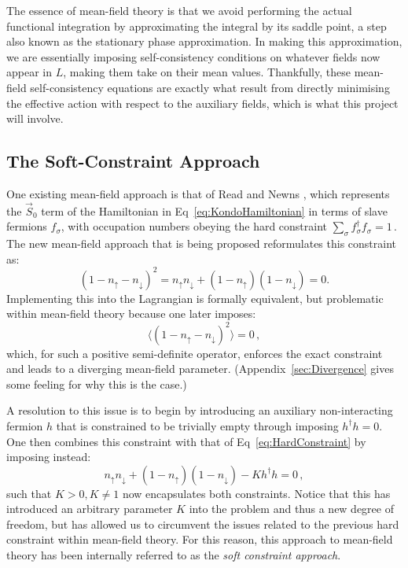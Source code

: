\documentclass[12pt]{article}
\begin{document}
The essence of mean-field theory is that we avoid performing the actual functional integration by approximating the integral by its saddle point, a step also known as the stationary phase approximation. In making this approximation, we are essentially imposing self-consistency conditions on whatever fields now appear in $ L $, making them take on their mean values. Thankfully, these mean-field self-consistency equations are exactly what result from directly minimising the effective action with respect to the auxiliary fields, which is what this project will involve.


\subsection{The Soft-Constraint Approach}


One existing mean-field approach is that of Read and Newns \cite{ReadNewns}, which represents the $ \vec{S}_0 $ term of the Hamiltonian in Eq~\eqref{eq:KondoHamiltonian} in terms of slave fermions $ f^{}_{\sigma} $, with occupation numbers obeying the hard constraint $ \sum_{\sigma} f^{\dagger}_{\sigma} f^{}_{\sigma} = 1 \,. $ The new mean-field approach that is being proposed reformulates this constraint as: \begin{equation} (1 - n_{\uparrow} - n_{\downarrow})^2 = n_{\uparrow} n_{\downarrow} + (1 - n_{\uparrow})(1 - n_{\downarrow}) = 0 . \label{eq:HardConstraint}\end{equation} Implementing this into the Lagrangian is formally equivalent, but problematic within mean-field theory because one later imposes: \[ \langle (1 - n_{\uparrow} - n_{\downarrow})^2 \rangle = 0\,, \] which, for such a positive semi-definite operator, enforces the exact constraint and leads to a diverging mean-field parameter. (Appendix~\ref{sec:Divergence} gives some feeling for why this is the case.)

A resolution to this issue is to begin by introducing an auxiliary non-interacting fermion $ h $ that is constrained to be trivially empty through imposing $ h^{\dagger} h = 0 $. One then combines this constraint with that of Eq~\eqref{eq:HardConstraint} by imposing instead: \begin{equation} n_{\uparrow} n_{\downarrow} + (1 - n_{\uparrow})(1 - n_{\downarrow}) - K h^{\dagger} h = 0\,, \end{equation} such that $ K > 0, K \neq 1 $ now encapsulates both constraints. Notice that this has introduced an arbitrary parameter $ K $ into the problem and thus a new degree of freedom, but has allowed us to circumvent the issues related to the previous hard constraint within mean-field theory. For this reason, this approach to mean-field theory has been internally referred to as the \emph{soft constraint approach}.
\end{document}
